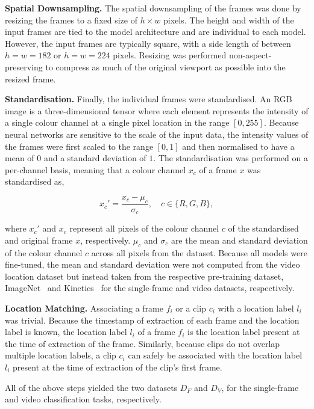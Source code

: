 \documentclass[a4paper]{article}
\begin{document}
\textbf{Spatial Downsampling.} The spatial downsampling of the frames was done
by resizing the frames to a fixed size of $h \times w$ pixels. The height and
width of the input frames are tied to the model architecture and are individual
to each model. However, the input frames are typically square, with a side
length of between $h=w=182$ or $h=w=224$ pixels. Resizing was performed
non-aspect-preserving to compress as much of the original viewport as possible
into the resized frame.

\textbf{Standardisation.} Finally, the individual frames were standardised. An
RGB image is a three-dimensional tensor where each element represents the
intensity of a single colour channel at a single pixel location in the range
$[0, 255]$. Because neural networks are sensitive to the scale of the input
data, the intensity values of the frames were first scaled to the range $[0, 1]$
and then normalised to have a mean of $0$ and a standard deviation of $1$. The
standardisation was performed on a per-channel basis, meaning that a colour
channel $x_c$ of a frame $x$ was standardised as,

\begin{equation}
  x_{c}' = \frac{x_{c} - \mu_c}{\sigma_c}, \quad c \in \{R, G, B\},
\end{equation}

where $x_{c}'$ and $x_c$ represent all pixels of the colour channel $c$ of the
standardised and original frame $x$, respectively. $\mu_c$ and $\sigma_c$ are
the mean and standard deviation of the colour channel $c$ across all pixels from
the dataset. Because all models were fine-tuned, the mean and standard deviation
were not computed from the video location dataset but instead taken from the
respective pre-training dataset, ImageNet~\cite{imagenet} and
Kinetics~\cite{kinetics} for the single-frame and video datasets, respectively.

\textbf{Location Matching.} Associating a frame $f_i$ or a clip $c_i$ with a
location label $l_i$ was trivial. Because the timestamp of extraction of each
frame and the location label is known, the location label $l_i$ of a frame $f_i$
is the location label present at the time of extraction of the frame. Similarly,
because clips do not overlap multiple location labels, a clip $c_i$ can safely
be associated with the location label $l_i$ present at the time of extraction of
the clip's first frame.

All of the above steps yielded the two datasets $D_F$ and $D_V$, for the
single-frame and video classification tasks, respectively.
\end{document}
